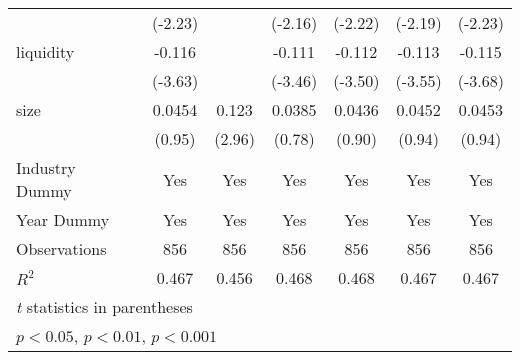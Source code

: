 {\begin{tabular}{l*{6}{c}}
            &     (-2.23)         &                     &     (-2.16)         &     (-2.22)         &     (-2.19)         &     (-2.23)         \\
[1em]
liquidity   &      -0.116\sym{***}&                     &      -0.111\sym{***}&      -0.112\sym{***}&      -0.113\sym{***}&      -0.115\sym{***}\\
            &     (-3.63)         &                     &     (-3.46)         &     (-3.50)         &     (-3.55)         &     (-3.68)         \\
[1em]
size        &      0.0454         &       0.123\sym{**} &      0.0385         &      0.0436         &      0.0452         &      0.0453         \\
            &      (0.95)         &      (2.96)         &      (0.78)         &      (0.90)         &      (0.94)         &      (0.94)         \\
\hline
Industry Dummy&         Yes         &         Yes         &         Yes         &         Yes         &         Yes         &         Yes         \\
Year Dummy  &         Yes         &         Yes         &         Yes         &         Yes         &         Yes         &         Yes         \\
Observations&         856         &         856         &         856         &         856         &         856         &         856         \\
$ R^2 $     &       0.467         &       0.456         &       0.468         &       0.468         &       0.467         &       0.467         \\
\hline\hline
\multicolumn{7}{l}{\footnotesize \textit{t} statistics in parentheses}\\
\multicolumn{7}{l}{\footnotesize \sym{*} \(p<0.05\), \sym{**} \(p<0.01\), \sym{***} \(p<0.001\)}\\
\end{tabular}
}
